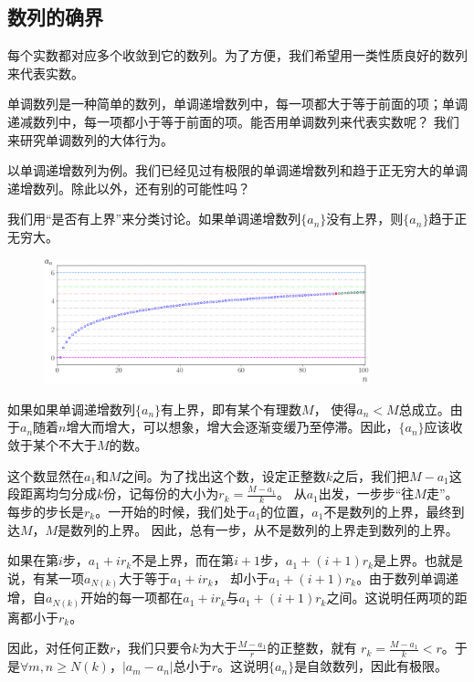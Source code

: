 \documentclass[12pt,UTF8]{ctexbook}
\begin{document}
\subsection{数列的确界}
每个实数都对应多个收敛到它的数列。为了方便，我们希望用一类性质良好的数列来代表实数。

单调数列是一种简单的数列，单调递增数列中，每一项都大于等于前面的项；单调递减数列中，每一项都小于等于前面的项。能否用单调数列来代表实数呢？
我们来研究单调数列的大体行为。

以单调递增数列为例。我们已经见过有极限的单调递增数列和趋于正无穷大的单调递增数列。除此以外，还有别的可能性吗？

我们用“是否有上界”来分类讨论。如果单调递增数列$\{a_n\}$没有上界，则$\{a_n\}$趋于正无穷大。

\begin{figure}[h]
    \vspace{-4pt}
    \centering
    \includegraphics[width=0.84\textwidth]{tu/上确界1.png}
\end{figure}

如果如果单调递增数列$\{a_n\}$有上界，即有某个有理数$M$，
使得$a_n < M$总成立。由于$a_n$随着$n$增大而增大，可以想象，增大会逐渐变缓乃至停滞。因此，$\{a_n\}$应该收敛于某个不大于$M$的数。

这个数显然在$a_1$和$M$之间。为了找出这个数，设定正整数$k$之后，我们把$M - a_1$这段距离均匀分成$k$份，记每份的大小为$r_k = \frac{M - a_1}{k}$。
从$a_1$出发，一步步“往$M$走”。每步的步长是$r_k$。一开始的时候，我们处于$a_1$的位置，$a_1$不是数列的上界，最终到达$M$，$M$是数列的上界。
因此，总有一步，从不是数列的上界走到数列的上界。

如果在第$i$步，$a_1 + i r_k$不是上界，而在第$i+1$步，$a_1 + (i+1) r_k$是上界。也就是说，有某一项$a_{N(k)}$大于等于$a_1 + i r_k$，
却小于$a_1 + (i+1) r_k$。由于数列单调递增，自$a_{N(k)}$开始的每一项都在$a_1 + i r_k$与$a_1 + (i+1) r_k$之间。这说明任两项的距离都小于$r_k$。

因此，对任何正数$r$，我们只要令$k$为大于$\frac{M - a_1}{r}$的正整数，就有
$r_k = \frac{M - a_1}{k} < r$。于是$\forall m,n\geqslant N(k)$，$|a_m - a_n|$总小于$r$。这说明$\{a_n\}$是自敛数列，因此有极限。
\end{document}
